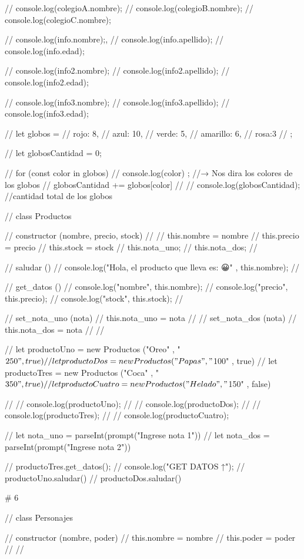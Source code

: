 // console.log(colegioA.nombre);
// console.log(colegioB.nombre);
// console.log(colegioC.nombre);

// console.log(info.nombre);,
// console.log(info.apellido);
// console.log(info.edad);

// console.log(info2.nombre);
// console.log(info2.apellido);
// console.log(info2.edad);

// console.log(info3.nombre);
// console.log(info3.apellido);
// console.log(info3.edad);

// let globos = {
// rojo: 8,
// azul: 10,
// verde: 5,
// amarillo: 6,
// rosa:3
// };

// let globosCantidad = 0;

// for (const color in globos) {
// console.log(color) ; //→ Nos dira los colores de los globos
// globosCantidad += globos[color]
// }
// console.log(globosCantidad); //cantidad total de los globos

// class Productos {

// constructor (nombre, precio, stock)
// {
// this.nombre = nombre
// this.precio = precio
// this.stock = stock
// this.nota_uno;
// this.nota_dos;
// }

// saludar (){
// console.log("Hola, el producto que lleva es: 😀" , this.nombre);
// }

// get_datos (){
// console.log("nombre", this.nombre);
// console.log("precio", this.precio);
// console.log("stock", this.stock);
// }

// set_nota_uno (nota) {
// this.nota_uno = nota
// }
// set_nota_dos (nota){
// this.nota_dos = nota
// }
// }

// let productoUno = new Productos ("Oreo" , "$250" , true)
// let productoDos = new Productos ("Papas" , "$100" , true)
// let productoTres = new Productos ("Coca" , "$350" , true)
// let productoCuatro = new Productos ("Helado" , "$150" , false)

// // console.log(productoUno);
// // console.log(productoDos);
// // console.log(productoTres);
// // console.log(productoCuatro);

// let nota_uno = parseInt(prompt("Ingrese nota 1"))
// let nota_dos = parseInt(prompt("Ingrese nota 2"))

// productoTres.get_datos();
// console.log("GET DATOS ↑");
// productoUno.saludar()
// productoDos.saludar()

# 6

// class Personajes {

// constructor (nombre, poder){
// this.nombre = nombre
// this.poder = poder
// }
// }


